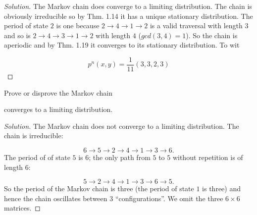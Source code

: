 \documentclass[12pt]{article}
\newenvironment{problem}[2][Problem]{\begin{trivlist}
\item[\hskip \labelsep {\bfseries #1}\hskip \labelsep {\bfseries #2.}]}{\end{trivlist}}
\newenvironment{solution}
  {\begin{proof}[Solution]\renewcommand{\qedsymbol}{}}
  {\end{proof}}
\begin{document}
\begin{solution} 

The Markov chain does converge to a limiting distribution. The chain is obviously irreducible so by Thm. 1.14 it has a unique stationary distribution. The period of state $2$ is one because $2 \rightarrow 4 \rightarrow 1 \rightarrow 2$ is a valid traversal with length $3$ and so is $2 \rightarrow 4 \rightarrow 3 \rightarrow 1 \rightarrow 2$ with length $4$ ($gcd(3,4)=1$). So the chain is aperiodic and by Thm. 1.19 it converges to its stationary distribution. To wit

$$ p^n(x,y) = \frac{1}{11}(3,3,2,3)$$

\end{solution}



\begin{problem}{1c} %
Prove or disprove the Markov chain


\begin{center}

\end{center}
converges to a limiting distribution.
\end{problem}
 
\begin{solution} 

The Markov chain does not converge to a limiting distribution. The chain is irreducible:

$$ 6\rightarrow 5\rightarrow 2\rightarrow 4\rightarrow 1\rightarrow 3\rightarrow 6.$$
The period of of state $5$ is 6; the only path from $5$ to $5$ without repetition is of length $6$:

$$ 5 \rightarrow 2\rightarrow 4\rightarrow 1\rightarrow 3\rightarrow 6\rightarrow 5.$$
So the period of the Markov chain is three (the period of state $1$ is three) and hence the chain oscillates between 3 ``configurations''. We omit the three $6\times6$ matrices.

\end{solution}
\end{document}
